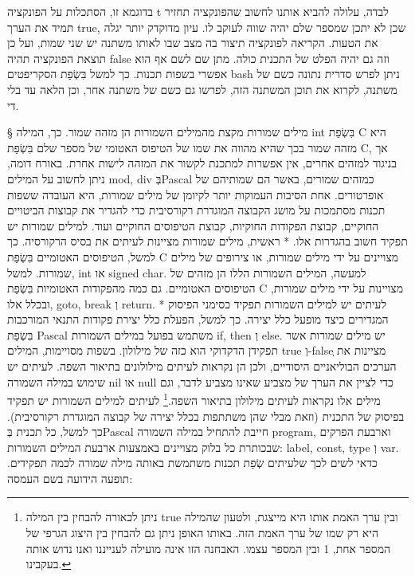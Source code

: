       בדוגמא זו, הסתכלות על הפונקציה t לבדה, עלולה להביא אותנו לחשוב שהפונקציה תחזיר
      תמיד את הערך true, שכן לא יתכן שמספר שלם יהיה שווה לעוקב לו. עיון מדוקדק יותר
      יגלה את הטעות. הקריאה לפונקציה תיצור בה מצב שבו לאותו משתנה יש שני שמות, ועל כן
      תוצאת הפונקציה תהיה false וזה גם יהיה הפלט של התכנית כולה.  מתן שם לשם אף הוא
      אפשרי בשפות תכנות. כך למשל בִּשְׂפַת  הסקריפטים bash ניתן לפרש סדרית נתונה כשם של
      משתנה, לקרוא את תוכן המשתנה הזה, לפרשו גם כשם של משתנה אחר, וכן הלאה עד בלי די.

      § מילים שמורות
      מקצת מהמילים השמורות הן מזהה שמור. כך, המילה int בִּשְׂפַת C היא מזהה שמור בכך שהיא מהווה את שמו של הטיפוס האטומי של מספר שלם בִּשְׂפַת C, אך בניגוד למזהים אחרים, אין אפשרות למתכנת לקשור את המזהה לישות אחרת.
      באורח דומה, ניתן לחשוב על המילים mod, div בְּPascal כמזהים שמורים, באשר הם שמותיהם של אופרטורים.
      אחת הסיבות העמוקות יותר לקיומן של מילים שמורות, היא העובדה ששפות תכנות מסתמכות על מושג הקבוצה המוגדרת רקורסיבית כדי להגדיר את קבוצות הביטויים החוקיים, קבוצת הפקודות החוקיות, קבוצת הטיפוסים החוקיים ועוד.
      למילים שמורות יש תפקיד חשוב בהגדרות אלו.
      * ראשית, מילים שמורות מציינות לעיתים את בסיס הרקורסיה. כך למשל, הטיפוסים האטומיים בִּשְׂפַת C מצויינים על ידי מילים שמורות, או צירופים של מילים שמורות. למשל, int או signed char. למעשה, המילים השמורות הללו הן מזהים של הטיפוסים האטומיים. גם כמה מהפקודות האטומיות בִּשְׂפַת C מצויינות על ידי מילים שמורות, ובכלל אלו, goto, break וְ return.
      * לעיתים יש למילים השמורות תפקיד כסימני הפיסוק המגדירים כיצד מופעל כלל יצירה. כך למשל, הפעלת כלל יצירת פקודות התנאי המורכבות בִּשְׂפַת   Pascal משתמש בפועל במילים השמורות if, then וְ else.
      יש מילים שמורות אשר תפקידן הדקדוקי הוא כזה של מילולון. בשפות מסויימות, המילים true וְ-falseְ מציינות את הערכים הבוליאניים היסודיים, ולכן הן נקראות לעיתים מילולונים בתיאור השפה. לעיתים יש שימוש במילה השמורה nil או null כדי לציין את הערך של מצביע שאינו מצביע לדבר, וגם מילים אלו נקראות לעיתים מילולון בתיאור השפה.\footnote{ניתן לכאורה להבחין בין המילה true ובין ערך האמת אותו היא מייצגת, ולטעון שהמילה היא רק שמו של ערך האמת הזה. באותו האופן ניתן גם להבחין בין היצוג הגרפי של המספר אחת, 1 ובין המספר עצמו. האבחנה הזו אינה מועילה לענייננו ואנו נדוש אותה בעקבינו.}
      לעיתים למילים השמורות יש תפקיד בפיסוק של התכנית (וזאת מבלי שהן משתתפות בכלל יצירה של קבוצה המוגדרת רקורסיבית). כך למשל, כל תכנית בְּPascal חייבת להתחיל במילה השמורה program, וארבעת הפרקים שבכותרת כל בלוק מצויינים באמצעות ארבעת המילים השמורות: label, const, type וְ var.
      כדאי לשים לכך שלעיתים שְׂפַת תכנות משתמשת באותה מילה שמורה לכמה תפקידים. תופעה הידועה בשם העמסה:
